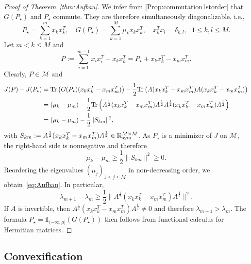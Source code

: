 \documentclass{article}
\def\R{\mathbb R}
\newcommand{\1}{{\mathds 1}}
\begin{document}
\begin{proof}[Proof of Theorem~\ref{thm:Aufbau}]


We infer from \eqref{Prop:commutation1storder} that $G(P_\star)$ and $P_\star$ commute. They are therefore simultaneously diagonalizable, i.e.,
\begin{equation}
        P_\star = \sum_{k= 1}^{m} x_{k} x_{k}^T, \quad 
            G(P_\star) =  \sum_{k=1}^{M} \mu_{k} x_{k} x_{k}^T, \quad 
            x_{k}^T x_{l}  = \delta_{k,l},~~~ 1\leq k,l\leq M.
\end{equation}
Let $m < k \le M$ and 
\begin{equation}
    P := \sum_{i= 1}^{m-1} x_{i} x_{i}^T + x_{k}x_{k}^T = P_\star + x_{k}x_{k}^T - x_{m}x_{m}^T.
\end{equation}
Clearly, $P \in \mathcal M$ and
\begin{equation*}
    \begin{split}
        J(P)  - J(P_\star) & =  {\rm Tr}\left(G(P_\star) (x_{k}x_{k}^T - x_{m}x_{m}^T)\right)  - \frac{1}{2} {\rm Tr}\left( A(x_{k}x_{k}^T - x_{m}x_{m}^T)A(x_{k}x_{k}^T - x_{m}x_{m}^T)\right) \\
        & = (\mu_{k} - \mu_{m}) -  \frac{1}{2} {\rm Tr}\left(A^{\frac{1}{2}}(x_{k}x_{k}^T - x_{m}x_{m}^T)A^{\frac{1}{2}}A^{\frac{1}{2}}(x_{k}x_{k}^T - x_{m}x_{m}^T)A^{\frac{1}{2}}\right)\\
        & = (\mu_{k} - \mu_{m}) -  \frac{1}{2} \lVert S_{km} \rVert^2,
    \end{split}
\end{equation*}
with $S_{km} := A^{\frac{1}{2}}(x_{k}x_{k}^T - x_{m}x_{m}^T)A^{\frac{1}{2}} \in \R^{M \times M}_{\rm sym}$. As $P_\star$ is a minimizer of $J$ on $\mathcal M$, the right-hand side is nonnegative and therefore
$$
\mu_{k} - \mu_{m} \ge \frac{1}{2} \lVert S_{km} \rVert^2 \ge 0.
$$
Reordering the eigenvalues $(\mu_j)_{1 \le j \le M}$ in non-decreasing order, we  obtain~\eqref{eq:Aufbau}. In particular,
$$
\lambda_{m+1} - \lambda_{m} \ge \frac{1}{2} \lVert A^{\frac{1}{2}}(x_{k}x_{k}^T - x_{m}x_{m}^T)A^{\frac{1}{2}} \rVert^2.
$$ 
If $A$ is invertible, then $A^{\frac{1}{2}}(x_{k}x_{k}^T - x_{m}x_{m}^T)A^{\frac{1}{2}} \neq 0$ and therefore $\lambda_{m+1} > \lambda_m$. The formula ${P_\star=\mathds 1_{(-\infty,\mu]}(G(P_\star))}$ then follows from functional calculus for Hermitian matrices.
\end{proof}



\subsection{Convexification}
\label{sec:convexification}
\end{document}
